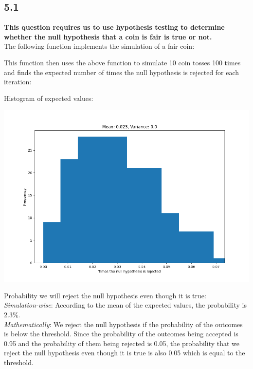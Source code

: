 \documentclass[answers]{exam}
\begin{document}
\subsection*{5.1}
\textbf{This question requires us to use hypothesis testing to determine whether the null hypothesis that a coin is fair is true or not. }\\
The following function implements the simulation of a fair coin:

This function then uses the above function to simulate 10 coin tosses 100 times and finds the expected number of times the null hypothesis is rejected for each iteration:

Histogram of expected values:
\begin{center}
  \includegraphics[scale = 0.5]{Q5/Q5.1.png}
\end{center}
Probability we will reject the null hypothesis even though it is true:\\
\emph{Simulation-wise}: According to the mean of the expected values, the probability is $2.3\%$.\\
\emph{Mathematically}: We reject the null hypothesis if the probability of the outcomes is below the threshold. Since the probability of the outcomes being accepted is 0.95 and the probability of them being rejected is 0.05, the probability that we reject the null hypothesis even though it is true is also 0.05 which is equal to the threshold.
\end{document}
